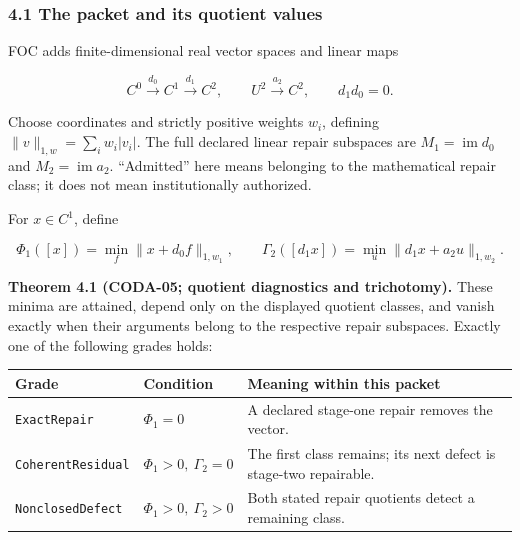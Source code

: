 \documentclass[
  11pt,
]{article}
\begin{document}
\subsubsection{4.1 The packet and its quotient values}\label{the-packet-and-its-quotient-values}

FOC adds finite-dimensional real vector spaces and linear maps

\[
 C^0\xrightarrow{d_0}C^1\xrightarrow{d_1}C^2,
 \qquad U^2\xrightarrow{a_2}C^2,
 \qquad d_1d_0=0.
\]

Choose coordinates and strictly positive weights \(w_i\), defining \(\|v\|_{1,w}=\sum_i w_i|v_i|\). The full declared linear repair subspaces are \(M_1=\operatorname{im}d_0\) and \(M_2=\operatorname{im}a_2\). ``Admitted'' here means belonging to the mathematical repair class; it does not mean institutionally authorized.

For \(x\in C^1\), define

\[
 \Phi_1([x])=\min_f\|x+d_0f\|_{1,w_1},\qquad
 \Gamma_2([d_1x])=\min_u\|d_1x+a_2u\|_{1,w_2}.
\]

\textbf{Theorem 4.1 (CODA-05; quotient diagnostics and trichotomy).} These minima are attained, depend only on the displayed quotient classes, and vanish exactly when their arguments belong to the respective repair subspaces. Exactly one of the following grades holds:

\begin{longtable}[]{@{}
  >{\raggedright\arraybackslash}p{}
  >{\raggedright\arraybackslash}p{}
  >{\raggedright\arraybackslash}p{}@{}}
\toprule\noalign{}
\begin{minipage}[b]{\linewidth}\raggedright
Grade
\end{minipage} & \begin{minipage}[b]{\linewidth}\raggedright
Condition
\end{minipage} & \begin{minipage}[b]{\linewidth}\raggedright
Meaning within this packet
\end{minipage} \\
\midrule\noalign{}
\endhead
\bottomrule\noalign{}
\endlastfoot
\texttt{ExactRepair} & \(\Phi_1=0\) & A declared stage-one repair removes the vector. \\
\texttt{CoherentResidual} & \(\Phi_1>0,\ \Gamma_2=0\) & The first class remains; its next defect is stage-two repairable. \\
\texttt{NonclosedDefect} & \(\Phi_1>0,\ \Gamma_2>0\) & Both stated repair quotients detect a remaining class. \\
\end{longtable}
\end{document}
